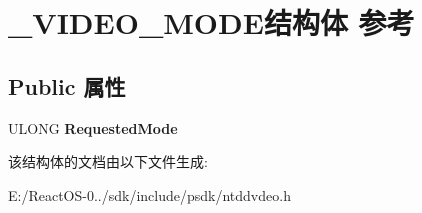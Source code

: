 \hypertarget{struct___v_i_d_e_o___m_o_d_e}{}\section{\+\_\+\+V\+I\+D\+E\+O\+\_\+\+M\+O\+D\+E结构体 参考}
\label{struct___v_i_d_e_o___m_o_d_e}
\subsection*{Public 属性}
\begin{DoxyCompactItemize}
\item 
\mbox{\label{struct___v_i_d_e_o___m_o_d_e_aec36784420de0f0e1b7587f8bdf2c48b}} 
U\+L\+O\+NG {\bfseries Requested\+Mode}
\end{DoxyCompactItemize}


该结构体的文档由以下文件生成\+:\begin{DoxyCompactItemize}
\item 
E\+:/\+React\+O\+S-\/0../sdk/include/psdk/ntddvdeo.\+h\end{DoxyCompactItemize}
